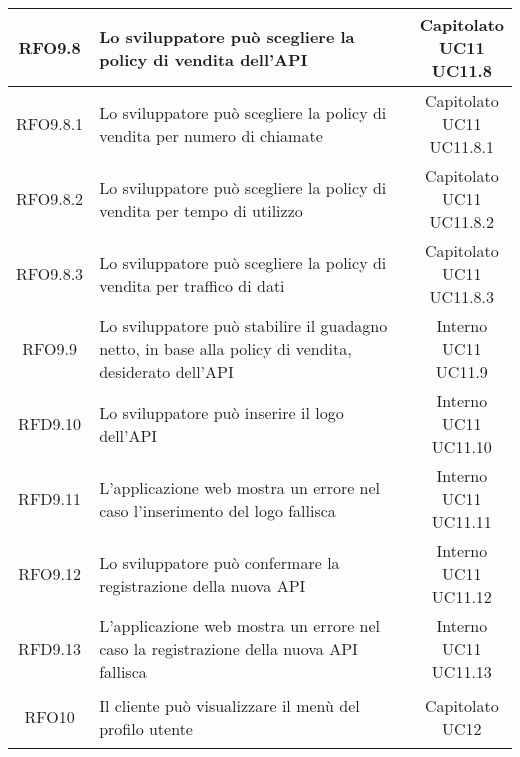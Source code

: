 \begin{longtable}{|c|p{8cm}|c|}
\hypertarget{RFO9.8}{RFO9.8} & Lo sviluppatore può scegliere la policy di vendita dell'API & \makecell*{Capitolato\\UC11\\UC11.8} \\
\hline

\hypertarget{RFO9.8.1}{RFO9.8.1} & Lo sviluppatore può scegliere la policy di vendita per numero di chiamate & \makecell*{Capitolato\\UC11\\UC11.8.1} \\
\hline
\hypertarget{RFO9.8.2}{RFO9.8.2} & Lo sviluppatore può scegliere la policy di vendita per tempo di utilizzo & \makecell*{Capitolato\\UC11\\UC11.8.2} \\
\hline
\hypertarget{RFO9.8.3}{RFO9.8.3} & Lo sviluppatore può scegliere la policy di vendita per traffico di dati & \makecell*{Capitolato\\UC11\\UC11.8.3} \\
\hline

\hypertarget{RFO9.9}{RFO9.9} & Lo sviluppatore può stabilire il guadagno netto, in base alla policy di vendita, desiderato dell'API & \makecell*{Interno\\UC11\\UC11.9} \\
\hline
\hypertarget{RFD9.10}{RFD9.10} & Lo sviluppatore può inserire il logo dell'API & \makecell*{Interno\\UC11\\UC11.10} \\
\hline
\hypertarget{RFD9.11}{RFD9.11} & L'applicazione web mostra un errore nel caso l'inserimento del logo fallisca & \makecell*{Interno\\UC11\\UC11.11} \\
\hline
\hypertarget{RFO9.12}{RFO9.12} & Lo sviluppatore può confermare la registrazione della nuova API & \makecell*{Interno\\UC11\\UC11.12} \\
\hline
\hypertarget{RFD9.13}{RFD9.13} & L'applicazione web mostra un errore nel caso la registrazione della nuova API fallisca & \makecell*{Interno\\UC11\\UC11.13} \\
\hline

\hypertarget{RFO10}{RFO10} & Il cliente può visualizzare il menù del profilo utente & \makecell*{Capitolato\\UC12} \\
\hline


\end{longtable}
